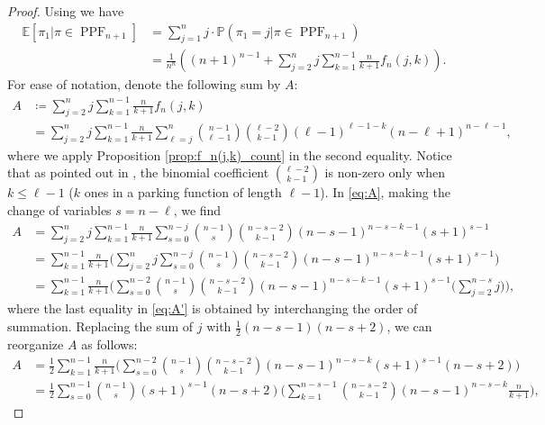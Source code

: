 \documentclass[12pt,reqno]{amsart}
\theoremstyle{definition}
\newcommand{\E}{\mathbb{E}}
\theoremstyle{remark}
\DeclareMathOperator{\PPF}{PPF}
\newcommand{\PR}{\mathbb{P}}
\begin{document}
\begin{proof}
Using  we have
    \begin{align} 
    \E[\pi_1 | \pi \in \PPF_{n+1}]&=\sum_{j=1}^{n}j\cdot \PR(\pi_1=j|\pi\in \PPF_{n+1})\nonumber\\
    &=\frac{1}{n^n}\left((n+1)^{n-1}+\sum_{j=2}^n j\sum_{k=1}^{n-1}\frac{n}{k+1}f_n(j,k)\right).\label{eq:expected value}
    \end{align}
   For ease of notation, denote the following sum by $A$:   
    \begin{align}
      A&\coloneqq \sum_{j=2}^n j\sum_{k=1}^{n-1}\frac{n}{k+1}f_n(j,k)\nonumber\\
      &=  \sum_{j=2}^n j\sum_{k=1}^{n-1}\frac{n}{k+1}\sum_{\ell=j}^n\binom{n-1}{\ell-1}\binom{\ell-2}{k-1}(\ell-1)^{\ell-1-k}(n-\ell+1)^{n-\ell-1},\label{eq:A}
    \end{align}
    where we apply Proposition \ref{prop:f_n(j,k)_count} in the second equality. Notice that as pointed out in , the binomial coefficient \(\binom{\ell-2}{k-1}\) is non-zero only when $k \leq \ell-1$ ($k$ ones in a parking function of length $\ell-1$). 
    In \eqref{eq:A}, making the change of variables $s=n-\ell$, we find
    \begin{align}
         A &=\sum_{j=2}^{n}j\sum_{k=1}^{n-1}\frac{n}{k+1}\sum_{s=0}^{n-j}\binom{n-1}{s}\binom{n-s-2}{k-1}(n-s-1)^{n-s-k-1}(s+1)^{s-1}\nonumber\\
        &=\sum_{k=1}^{n-1}\frac{n}{k+1} \Big( \sum_{j=2}^{n}j \sum_{s=0}^{n-j}\binom{n-1}{s}\binom{n-s-2}{k-1}(n-s-1)^{n-s-k-1}(s+1)^{s-1} \Big)\nonumber\\
        &=\sum_{k=1}^{n-1}\frac{n}{k+1} \Bigg( \sum_{s=0}^{n-2}  \binom{n-1}{s}\binom{n-s-2}{k-1}(n-s-1)^{n-s-k-1}(s+1)^{s-1}  \Big(\sum_{j=2}^{n-s} j\Big)\Bigg), \label{eq:A'}
    \end{align}
 where the last equality in \eqref{eq:A'} is obtained by interchanging the order of summation. Replacing the sum of $j$ with $\frac{1}{2} (n-s-1)(n-s+2)$, we can reorganize $A$ as follows:
\begin{align}
A&=\frac{1}{2}\sum_{k=1}^{n-1}\frac{n}{k+1} \Bigg( \sum_{s=0}^{n-2}  \binom{n-1}{s}\binom{n-s-2}{k-1}(n-s-1)^{n-s-k}(s+1)^{s-1}   (n-s+2)\Bigg)\nonumber\\
&=\frac{1}{2}\sum_{s=0}^{n-1} \binom{n-1}{s} (s+1)^{s-1}   (n-s+2) \Bigg( \sum_{k=1}^{n-s-1}  \binom{n-s-2}{k-1}(n-s-1)^{n-s-k} \frac{n}{k+1}\Bigg),\label{eq:will simplify this junk}
\end{align}

\end{proof}
\end{document}

